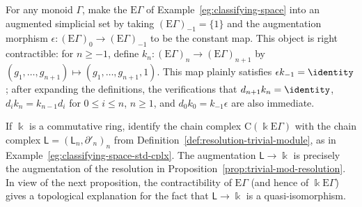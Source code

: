 \begin{example}\label{eg:classifying-contractible}
	For any monoid $\Gamma$, make the $\mathrm{E}\Gamma$ of
	Example~\ref{eg:classifying-space} into an augmented simplicial set by
	taking $(\mathrm{E}\Gamma)_{-1}=\{1\}$ and the augmentation morphism
	$\epsilon:(\mathrm{E}\Gamma)_0\to(\mathrm{E}\Gamma)_{-1}$ to be the
	constant map. This object is right contractible: for $n\geq-1$, define
	$k_n:(\mathrm{E}\Gamma)_n\to(\mathrm{E}\Gamma)_{n+1}$ by
	$(g_1,\ldots,g_{n+1})\mapsto(g_1,\ldots,g_{n+1},1)$.
	This map plainly satisfies $\epsilon k_{-1}=\identity$; after expanding
	the definitions, the verifications that $d_{n+1}k_n=\identity$,
	$d_ik_n=k_{n-1}d_i$ for $0\leq i\leq n$, $n\geq1$, and
	$d_0k_0=k_{-1}\epsilon$ are also immediate.

	If $\Bbbk$ is a commutative ring, identify the chain complex
	$\mathrm{C}(\Bbbk\mathrm{E}\Gamma)$ with the chain complex
	$\mathsf{L}=(\mathsf{L}_n,\partial'_n)_n$ from
	Definition~\ref{def:resolution-trivial-module}, as in
	Example~\ref{eg:classifying-space-std-cplx}. The augmentation
	$\mathsf{L}\to\Bbbk$ is precisely the augmentation of the resolution in
	Proposition~\ref{prop:trivial-mod-resolution}. In view of the next
	proposition, the contractibility of $\mathrm{E}\Gamma$ (and hence of
	$\Bbbk\mathrm{E}\Gamma$) gives a topological explanation for the fact
	that $\mathsf{L}\to\Bbbk$ is a quasi-isomorphism.
\end{example}

